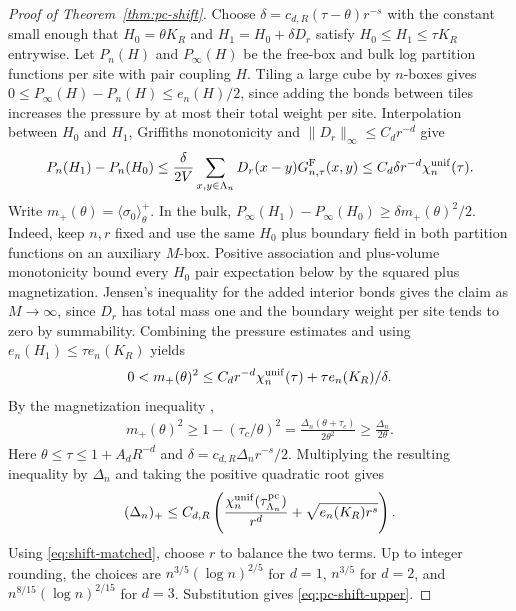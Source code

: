 \documentclass[11pt]{article}
\numberwithin{equation}{section}
\begin{document}
\begin{proof}[Proof of Theorem~\ref{thm:pc-shift}]
Choose $\delta=c_{d,R}(\tau-\theta)r^{-s}$ with the constant small
enough that $H_0=\theta K_R$ and $H_1=H_0+\delta D_r$ satisfy
$H_0\le H_1\le\tau K_R$ entrywise. Let $P_n(H)$ and $P_\infty(H)$
be the free-box and bulk log partition functions per site with pair
coupling $H$. Tiling a large cube by $n$-boxes gives
$0\le P_\infty(H)-P_n(H)\le e_n(H)/2$, since adding the bonds between
tiles increases the pressure by at most their total weight per site.
Interpolation between $H_0$ and $H_1$, Griffiths monotonicity and
$\|D_r\|_\infty\le C_dr^{-d}$ give
\begin{align}
 P_n(H_1)-P_n(H_0)
 \le \frac{\delta}{2V}\sum_{x,y\in\Lambda_n}
                D_r(x-y)G_{n,\tau}^{\rm F}(x,y)
 \le C_d\delta r^{-d}\chi_n^{\rm unif}(\tau).
\end{align}
Write $m_+(\theta)=\langle\sigma_0\rangle_\theta^+$. In the bulk,
$P_\infty(H_1)-P_\infty(H_0)\ge\delta m_+(\theta)^2/2$.
Indeed, keep $n,r$ fixed and use the same $H_0$ plus
boundary field in both partition functions on an auxiliary $M$-box.
Positive association and plus-volume monotonicity bound every
$H_0$ pair expectation below by the squared plus magnetization.
Jensen's inequality for the added interior bonds gives the claim as
$M\to\infty$, since $D_r$ has total mass one and the boundary weight
per site tends to zero by summability. Combining the pressure estimates
and using $e_n(H_1)\le\tau e_n(K_R)$ yields
\begin{align}
 0<m_+(\theta)^2
 \le C_d r^{-d}\chi_n^{\rm unif}(\tau)+\tau e_n(K_R)/\delta .
\end{align}
By the magnetization inequality \cite[Theorem~2.1(1)]{sharpness},
\begin{align}
 m_+(\theta)^2\ge 1-(\tau_c/\theta)^2
   =\frac{\Delta_n(\theta+\tau_c)}{2\theta^2}
   \ge\frac{\Delta_n}{2\theta}.
\end{align}
Here $\theta\le\tau\le 1+A_dR^{-d}$ and
$\delta=c_{d,R}\Delta_n r^{-s}/2$. Multiplying the resulting
inequality by $\Delta_n$ and taking the positive quadratic root gives
\begin{align}
 (\Delta_n)_+\le C_{d,R}\left(
 \frac{\chi_n^{\rm unif}(\tau_{\Lambda_n}^{\rm pc})}{r^d}
     +\sqrt{e_n(K_R)r^s}\right).
\end{align}
Using \eqref{eq:shift-matched}, choose $r$ to balance the two terms.
Up to integer rounding, the choices are $n^{3/5}(\log n)^{2/5}$ for
$d=1$, $n^{3/5}$ for $d=2$, and $n^{8/15}(\log n)^{2/15}$ for $d=3$.
Substitution gives \eqref{eq:pc-shift-upper}.


\end{proof}
\end{document}
